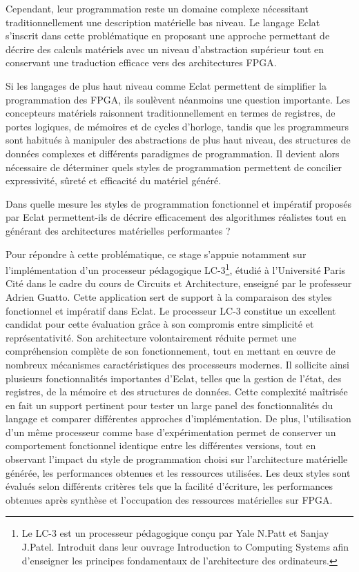 \documentclass{article}
\begin{document}
Cependant, leur programmation reste un domaine complexe nécessitant traditionnellement 
une description matérielle bas niveau. Le langage Eclat \cite{these_eclat} s'inscrit dans cette problématique 
en proposant une approche permettant de décrire des calculs matériels avec un niveau d'abstraction supérieur 
tout en conservant une traduction efficace vers des architectures FPGA. 

Si les langages de plus haut niveau comme Eclat permettent de simplifier la programmation des FPGA, 
ils soulèvent néanmoins une question importante. 
Les concepteurs matériels raisonnent traditionnellement en termes de registres, de portes logiques, 
de mémoires et de cycles d'horloge, tandis que les programmeurs sont habitués à 
manipuler des abstractions de plus haut niveau, des structures de données complexes et 
différents paradigmes de programmation. Il devient alors nécessaire de déterminer 
quels styles de programmation permettent de concilier expressivité, sûreté et efficacité du matériel généré.

Dans quelle mesure les styles de programmation fonctionnel et impératif proposés par Eclat 
permettent-ils de décrire efficacement des algorithmes réalistes tout en générant des 
architectures matérielles performantes ?

Pour répondre à cette problématique, ce stage s'appuie notamment sur l'implémentation d'un processeur pédagogique LC-3\footnote{Le LC-3 est un processeur pédagogique conçu par 
Yale N.Patt et Sanjay J.Patel. Introduit dans leur ouvrage 
Introduction to Computing Systems afin d'enseigner les principes fondamentaux de l'architecture des ordinateurs.}, 
étudié à l'Université Paris Cité dans le cadre du cours de Circuits et Architecture, enseigné par le professeur Adrien Guatto. 
Cette application sert de support à la comparaison des styles fonctionnel et impératif dans Eclat.
Le processeur LC-3 constitue un excellent candidat 
pour cette évaluation grâce à son compromis entre simplicité et représentativité. 
Son architecture volontairement réduite permet une compréhension complète de son fonctionnement, 
tout en mettant en œuvre de nombreux mécanismes caractéristiques des processeurs modernes. 
Il sollicite ainsi plusieurs fonctionnalités importantes d'Eclat, telles que la gestion de l'état, 
des registres, de la mémoire et des structures de données.
Cette complexité maîtrisée en fait un support pertinent pour tester un large panel des fonctionnalités 
du langage et comparer différentes approches d'implémentation. De plus, l'utilisation d'un même processeur 
comme base d'expérimentation permet de conserver un comportement fonctionnel identique entre les différentes versions, 
tout en observant l'impact du style de programmation choisi sur l'architecture matérielle générée, 
les performances obtenues et les ressources utilisées.
Les deux styles sont évalués selon différents critères tels que la 
facilité d'écriture, les performances obtenues après synthèse et l'occupation des ressources matérielles sur FPGA.
\end{document}
